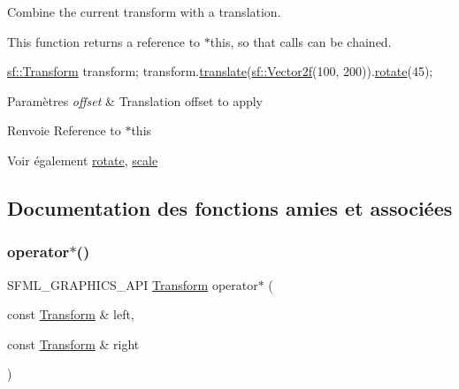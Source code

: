 Combine the current transform with a translation. 

This function returns a reference to $\ast$this, so that calls can be chained. 
\begin{DoxyCode}
\hyperlink{classsf_1_1Transform}{sf::Transform} transform;
transform.\hyperlink{classsf_1_1Transform_ab54f6c8070cc05e2afcb3145fbf4395a}{translate}(\hyperlink{classsf_1_1Vector2}{sf::Vector2f}(100, 200)).\hyperlink{classsf_1_1Transform_a3e548c3c9e3fb9d4bd43cf852669e555}{rotate}(45);
\end{DoxyCode}



\begin{DoxyParams}{Paramètres}
{\em offset} & Translation offset to apply\\
\hline
\end{DoxyParams}
\begin{DoxyReturn}{Renvoie}
Reference to $\ast$this
\end{DoxyReturn}
\begin{DoxySeeAlso}{Voir également}
\hyperlink{classsf_1_1Transform_a3e548c3c9e3fb9d4bd43cf852669e555}{rotate}, \hyperlink{classsf_1_1Transform_a3f46af807f69d74120fb836334268671}{scale} 
\end{DoxySeeAlso}


\subsection{Documentation des fonctions amies et associées}
\mbox{\label{classsf_1_1Transform_a423ade8d6aa1378c695f8eb4bfce8981}} 
\subsubsection{\texorpdfstring{operator$\ast$()}{operator*()}\hspace{0.1cm}{\footnotesize\ttfamily [1/2]}}
{\footnotesize\ttfamily S\+F\+M\+L\+\_\+\+G\+R\+A\+P\+H\+I\+C\+S\+\_\+\+A\+PI \hyperlink{classsf_1_1Transform}{Transform} operator$\ast$ (\begin{DoxyParamCaption}\item[{const \hyperlink{classsf_1_1Transform}{Transform} \&}]{left,  }\item[{const \hyperlink{classsf_1_1Transform}{Transform} \&}]{right }\end{DoxyParamCaption})\hspace{0.3cm}{\ttfamily [related]}}



